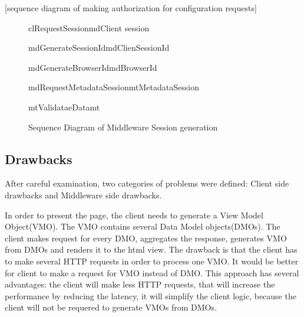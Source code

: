 [sequence diagram of making authorization for configuration requests]

\begin{figure}[h]
\begin{center}

	\resizebox{1.1\textwidth}{0.5\textwidth} {

	\begin{sequencediagram}

	\begin{call}{cl}{RequestSession}{md}{Client session}

		\begin{call}{md}{GenerateSessionId}{md}{ClienSessionId} \end{call}
		\begin{call}{md}{GenerateBrowserId}{md}{BrowserId} \end{call}
		\begin{call}{md}{RequestMetadataSession}{mt}{MetadataSession} 
			\begin{call}{mt}{ValidataeData}{mt}{}\end{call}
		\end{call}

	\end{call}

	\end{sequencediagram}
	}

\end{center}
\caption{Sequence Diagram of Middleware Session generation}
\label{fig:arch_sess_uml}
\end{figure}


\subsection{Drawbacks}

After careful examination, two categories of problems were defined: Client side drawbacks and Middleware side drawbacks. 

In order to present the page, the client needs to generate a View Model Object(VMO). The VMO contains several Data Model objects(DMOs). The client makes request for every DMO, aggregates the response, generates VMO from DMOs and renders it to the html view. The drawback is that the client has to make several HTTP requests in order to process one VMO. It would be better for client to make a request for VMO instead of DMO. This approach has several advantages: the client will make less HTTP requests, that will increase the performance by reducing the latency, it will simplify the client logic, because the client will not be requered to generate VMOs from DMOs. 

